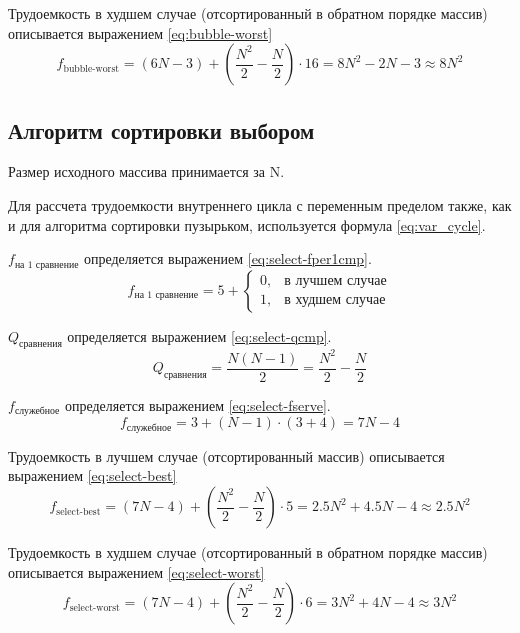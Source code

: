 Трудоемкость в худшем случае (отсортированный в обратном порядке массив) описывается выражением \ref{eq:bubble-worst} 
\begin{equation}
	\label{eq:bubble-worst}
	f_{\text{bubble-worst}} = (6N - 3) + (\frac{N^{2}}{2} - \frac{N}{2})\cdot16 = 8N^{2}-2N-3 \approx 8N^{2}
\end{equation}

\subsection{Алгоритм сортировки выбором}

Размер исходного массива принимается за N. 

Для рассчета трудоемкости внутреннего цикла с переменным пределом также, как и для алгоритма сортировки
пузырьком, используется формула \ref{eq:var_cycle}.

$f_{\text{на 1 сравнение}}$ определяется выражением \ref{eq:select-fper1cmp}.
\begin{equation}
	\label{eq:select-fper1cmp}
	f_{\text{на 1 сравнение}} = 5 + \begin{cases}
	0, & \text{в лучшем случае}\\
	1, & \text{в худшем случае}
	\end{cases}
\end{equation}

$Q_{\text{сравнения}}$ определяется выражением \ref{eq:select-qcmp}.
\begin{equation}
	\label{eq:select-qcmp}
	Q_{\text{сравнения}} = \frac{N(N-1)}{2} = \frac{N^{2}}{2} - \frac{N}{2}
\end{equation}

$f_{\text{служебное}}$ определяется выражением \ref{eq:select-fserve}.
\begin{equation}
	\label{eq:select-fserve}
	f_{\text{служебное}} = 3 + (N - 1) \cdot (3 + 4) = 7N - 4
\end{equation}

Трудоемкость в лучшем случае (отсортированный массив) описывается выражением \ref{eq:select-best}
\begin{equation}
	\label{eq:select-best}
	f_{\text{select-best}} = (7N-4) + (\frac{N^{2}}{2} - \frac{N}{2})\cdot5 = 2.5N^{2}+4.5N-4 \approx 2.5N^{2}
\end{equation}

Трудоемкость в худшем случае (отсортированный в обратном порядке массив) описывается выражением \ref{eq:select-worst} 
\begin{equation}
	\label{eq:select-worst}
	f_{\text{select-worst}} = (7N-4) + (\frac{N^{2}}{2} - \frac{N}{2})\cdot6 = 3N^{2}+4N-4 \approx 3N^{2}
\end{equation}
\newpage

